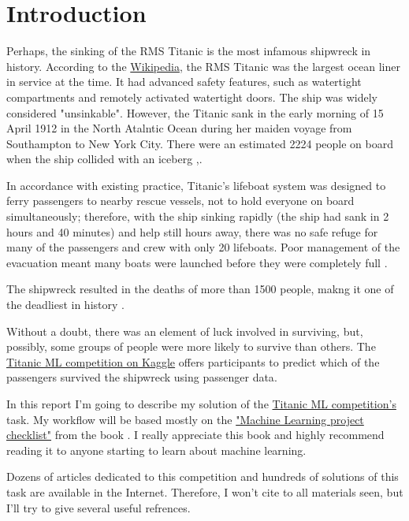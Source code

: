 \chapter{Introduction}
Perhaps, the sinking of the RMS Titanic is the most infamous shipwreck 
in history. According to the 
\href{https://en.wikipedia.org/wiki/Titanic}{Wikipedia}, 
the RMS Titanic was the largest ocean liner in service at the time. It
had advanced safety features, such as watertight compartments and 
remotely activated watertight doors. The ship was widely considered 
"unsinkable". However, the Titanic sank in the early morning of 15 April
1912 in the North Atalntic Ocean during her maiden voyage from 
Southampton to New York City. There were an estimated 2224 people on
board when the ship collided with an iceberg
\cite{titanic-wikipedia},\cite{sinking-of-the-titanic-wikipedia}.

In accordance with existing practice, Titanic's lifeboat system was 
designed to ferry passengers to nearby rescue vessels, not to hold 
everyone on board simultaneously; therefore, with the ship sinking 
rapidly (the ship had sank in 2 hours and 40 minutes) and help still 
hours away, there was no safe refuge for many of the passengers and 
crew with only 20 lifeboats. Poor management of the evacuation meant 
many boats were launched before they were completely full 
\cite{sinking-of-the-titanic-wikipedia}.

The shipwreck resulted in the deaths of more than 1500 people, makng it 
one of the deadliest in history \cite{sinking-of-the-titanic-wikipedia}.

Without a doubt, there was an element of luck involved in surviving, but,
possibly, some groups of people were more likely to survive than others.
The \href{https://www.kaggle.com/c/titanic}{Titanic ML competition on 
Kaggle} offers participants to predict which of the passengers survived 
the shipwreck using passenger data\cite{titanic-ml-competition}.

In this report I'm going to describe my solution of the
\href{https://www.kaggle.com/c/titanic}{Titanic ML competition's} task.
My workflow will be based mostly on the
\href{https://github.com/ageron/handson-ml/blob/master/ml-project-checklist.md}
{"Machine Learning project checklist"} from the book \cite{hands_on_ml}.
I really appreciate this book and highly recommend reading it to anyone 
starting to learn about machine learning. 

Dozens of articles dedicated to this competition and hundreds of solutions 
of this task are available in the Internet. Therefore, I won't cite to 
all materials seen, but I'll try to give several useful refrences.